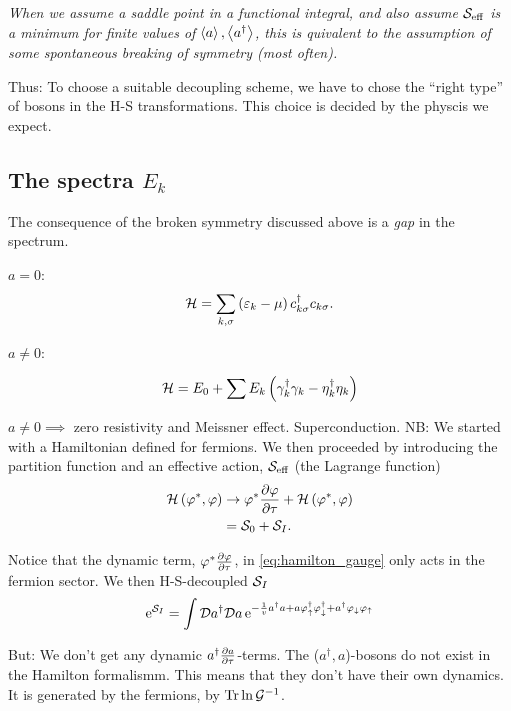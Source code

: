  \textit{When we assume a saddle point in a functional integral, and also assume $\mathcal{S}_\text{eff}$ is a minimum for finite values of $\ev{a}, \ev{a^\dagger}$, this is quivalent to the assumption of some spontaneous breaking of symmetry (most often).}
 
 Thus: To choose a suitable decoupling scheme, we have to chose the ``right type'' of bosons in the H-S transformations. This choice is decided by the physcis we expect. 


\subsection{The spectra $E_k$}
The consequence of the broken symmetry discussed above is a \emph{gap} in the spectrum.

$a = 0$:
\begin{equation}
	\mathcal{H} = \sum_{k, \sigma}\left(\varepsilon_k-\mu\right)c_{k\sigma}^\dagger c_{k\sigma}.
\end{equation}

$a \ne 0$:

\begin{equation}
	\mathcal{H} = E_0 + \sum E_k\left(\gamma_k^\dagger\gamma_k - \eta_k^\dagger\eta_k\right)
\end{equation}

$a \ne 0 \implies $ zero resistivity and Meissner effect. Superconduction.
NB: We started with a Hamiltonian defined for fermions. We then proceeded by introducing the partition function and an effective action, $\mathcal{S}_{\text{eff}}$ (the Lagrange function)
\begin{align}
\label{eq:hamilton_gauge}
\begin{split}
	\mathcal{H}\left(\varphi^*, \varphi\right)&\rightarrow \varphi^*\pdv{\varphi}{\tau} + \mathcal{H}\left(\varphi^*, \varphi\right) \\
	 &= \mathcal{S}_0 + \mathcal{S}_I.
\end{split}
\end{align}

Notice that the dynamic term, $\varphi^*\pdv{\varphi}{\tau}$, in \eqref{eq:hamilton_gauge} only acts in the fermion sector. We then H-S-decoupled $\mathcal{S}_I$
\begin{equation}
	\mathrm{e}^{\mathcal{S}_I } = \int\mathcal{D}a^\dagger\mathcal{D}a\,\mathrm{e}^{-\frac{1}{v}a^\dagger a+a\varphi_\uparrow^\dagger\varphi_\downarrow^\dagger + a^\dagger \varphi_\downarrow\varphi_\uparrow}
\end{equation}

But: We don't get any dynamic $a^\dagger\pdv{a}{\tau}$-terms. The ($a^\dagger, a$)-bosons do not exist in the Hamilton formalismm. This means that they don't have their own dynamics. It is generated by the fermions, by $\Tr\ln\mathcal{G}^{-1}$.

